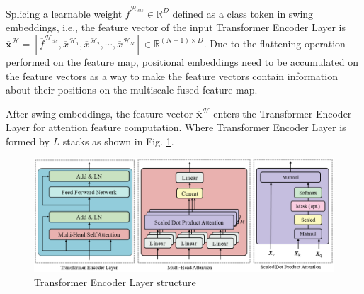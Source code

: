 Splicing a learnable weight $\overline{f}^{\mathcal{H}_{cls}}\in \mathbb{R}^D$ defined as a class token in swing embeddings, i.e., the feature vector of the input Transformer Encoder Layer is $\overline{\boldsymbol{x}}^\mathcal{H}=[\overline{f}^{\mathcal{H}_{cls}},\overline{x}^{\mathcal{H}_1},\overline{x}^{\mathcal{H}_2},\cdots ,\overline{x}^{\mathcal{H}_N} ] \in \mathbb{R}^{(N+1)\times D}$. Due to the flattening operation performed on the feature map, positional embeddings \cite{36} need to be accumulated on the feature vectors as a way to make the feature vectors contain information about their positions on the multiscale fused feature map.

After swing embeddings, the feature vector $\overline{\boldsymbol{x}}^\mathcal{H}$ enters the Transformer Encoder Layer for attention feature computation. Where Transformer Encoder Layer is formed by $L$ stacks as shown in Fig. \ref{fig:mhsa}.

\begin{figure}[H]
  \begin{center}
      \includegraphics[scale=0.5]{figure/mhsa.png}
  \end{center}
  \caption{Transformer Encoder Layer structure}
  \label{fig:mhsa}
\end{figure}

